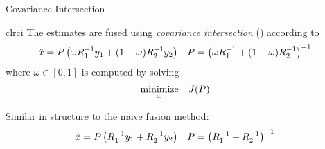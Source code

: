 \documentclass[aspectratio=1610]{beamer}
\begin{document}
\begin{frame}{Covariance Intersection}

\begin{rfshadedcolorbox}[title={Covariance Intersection}]{clrci}
The estimates are fused using \emph{covariance intersection} (\abbrCI) according to
\begin{align*}
    \hat{x} &= P\left( \omega R_1^{-1} y_1 + (1-\omega)R_2^{-1} y_2 \right) &
    P &= \left(\omega R_1^{-1} + (1-\omega)R_2^{-1} \right)^{-1}
\end{align*}
where $\omega\in[0,1]$ is computed by solving
\begin{equation*}
    \begin{aligned}
        & \underset{\omega}{\operatorname*{\rm minimize}} & & J(P)
    \end{aligned}
\end{equation*}
\end{rfshadedcolorbox}

\pause

\vspace{1em}

Similar in structure to the naive fusion method:
\begin{align*}
    \hat{x} &= P\left(R_1^{-1} y_1 + R_2^{-1} y_2  \right) &
    P &= \left(R_1^{-1} + R_2^{-1} \right)^{-1}
\end{align*}

\end{frame}
\end{document}
